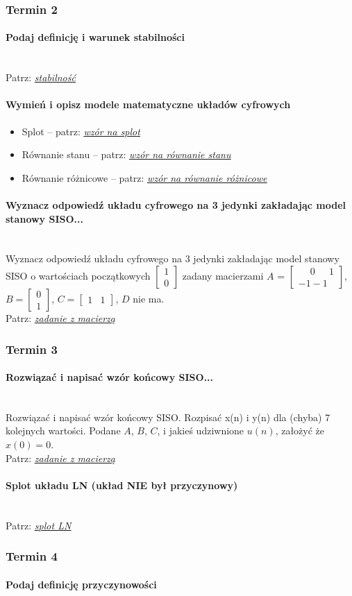 \documentclass[12pt]{scrartcl}
\newcommand{\link}[2]{
	\hyperref[#1]{\textit{\underline{#2}}}
}
\newcommand{\myparagraph}[1]{\paragraph{#1}\mbox{}\\}
\newcommand{\macierz}[1]{\begin{bmatrix}#1\end{bmatrix}}
\newcommand{\m}{\phantom{-}}
\begin{document}
\subsubsection{Termin 2}

\myparagraph{Podaj definicję i warunek stabilności}
Patrz: \hyperref[sec:przyczynowosc]{\textit{\underline{stabilność}}}

\paragraph{Wymień i opisz modele matematyczne układów cyfrowych}
\begin{itemize}[noitemsep,topsep=0pt]
	\item[--] Splot -- patrz: \link{eq:splot}{wzór na splot}
	\item[--] Równanie stanu -- patrz: \link{eq:rownanie_stanu}{wzór na równanie stanu}
	\item[--] Równanie różnicowe -- patrz: \link{eq:rownanie_roznicowe}{wzór na równanie różnicowe}
\end{itemize}

\myparagraph{Wyznacz odpowiedź układu cyfrowego na 3 jedynki zakładając model stanowy SISO...}
Wyznacz odpowiedź układu cyfrowego na 3 jedynki zakładając model stanowy SISO o wartościach początkowych $\macierz{1 \\ 0}$ zadany macierzami $A$ = $\macierz{\m0\ \m1\\ -1 -1}$, $B = \macierz{0 \\ 1}$, $C = \macierz{1 & 1}$, $D$ nie ma.\\

\noindent Patrz: \link{sec:macierz}{zadanie z macierzą}

\subsubsection{Termin 3}
\myparagraph{Rozwiązać i napisać wzór końcowy SISO...}
Rozwiązać i napisać wzór końcowy SISO. Rozpisać x(n) i y(n) dla (chyba) 7 kolejnych wartości. Podane $A$, $B$, $C$, i jakieś udziwnione $u(n)$, założyć że $x(0) = 0$.\\

\noindent Patrz: \link{sec:macierz}{zadanie z macierzą}

\myparagraph{Splot układu LN (układ NIE był przyczynowy)}
Patrz: \hyperref[sec:splotln]{\textit{\underline{splot LN}}}

\subsubsection{Termin 4}
\myparagraph{Podaj definicję przyczynowości}
\end{document}
